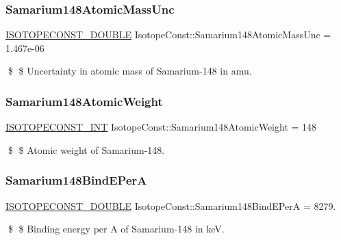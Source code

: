 \subsubsection{\texorpdfstring{Samarium148\+Atomic\+Mass\+Unc}{Samarium148AtomicMassUnc}}
{\footnotesize\ttfamily \mbox{\hyperlink{group___isotope_const-_macros_ga8f45a7272ce02c0b4c65c44636ed719a}{I\+S\+O\+T\+O\+P\+E\+C\+O\+N\+S\+T\+\_\+\+D\+O\+U\+B\+LE}} Isotope\+Const\+::\+Samarium148\+Atomic\+Mass\+Unc = 1.\+467e-\/06}

\$ \$ Uncertainty in atomic mass of Samarium-\/148 in amu. \mbox{\label{group___isotope_const-_samarium-_sm148_ga239ed760f835f97f97d121a14a60ff1a}} 
\subsubsection{\texorpdfstring{Samarium148\+Atomic\+Weight}{Samarium148AtomicWeight}}
{\footnotesize\ttfamily \mbox{\hyperlink{group___isotope_const-_macros_ga5f18360b3e99483a35c32d789e62621c}{I\+S\+O\+T\+O\+P\+E\+C\+O\+N\+S\+T\+\_\+\+I\+NT}} Isotope\+Const\+::\+Samarium148\+Atomic\+Weight = 148}

\$ \$ Atomic weight of Samarium-\/148. \mbox{\label{group___isotope_const-_samarium-_sm148_ga2191ad6a1268ce40bd67b51c6b4b279b}} 
\subsubsection{\texorpdfstring{Samarium148\+Bind\+E\+PerA}{Samarium148BindEPerA}}
{\footnotesize\ttfamily \mbox{\hyperlink{group___isotope_const-_macros_ga8f45a7272ce02c0b4c65c44636ed719a}{I\+S\+O\+T\+O\+P\+E\+C\+O\+N\+S\+T\+\_\+\+D\+O\+U\+B\+LE}} Isotope\+Const\+::\+Samarium148\+Bind\+E\+PerA = 8279.}

\$ \$ Binding energy per A of Samarium-\/148 in keV. \mbox{\label{group___isotope_const-_samarium-_sm148_gad64a4ff5a9c8838b513bfe84b3ed7021}} 
